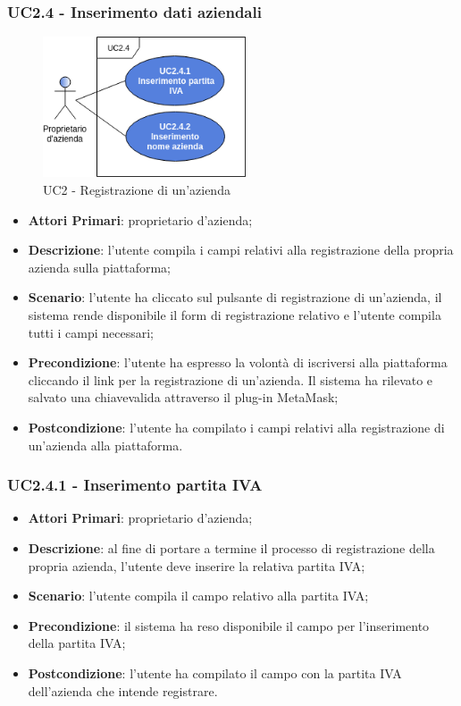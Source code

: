 \subsubsection{UC2.4 - Inserimento dati aziendali}
\begin{figure}[h]
	\includegraphics[width=6cm]{res/images/UC2-4RegistrazioneAzienda.png}
	\centering
	\caption{UC2 - Registrazione di un'azienda}
\end{figure}
\begin{itemize}
	\item \textbf{Attori Primari}: proprietario d'azienda;
	\item \textbf{Descrizione}: l'utente compila i campi relativi alla registrazione della propria azienda sulla piattaforma;
	\item \textbf{Scenario}: l'utente ha cliccato sul pulsante di registrazione di un'azienda, il sistema rende disponibile il form di registrazione relativo e l'utente compila tutti i campi necessari;
	\item \textbf{Precondizione}: l'utente ha espresso la volontà di iscriversi alla piattaforma cliccando il link per la registrazione di un'azienda. Il sistema ha rilevato e salvato una chiave\glosp valida attraverso il plug-in MetaMask\glo;
	\item \textbf{Postcondizione}: l'utente ha compilato i campi relativi alla registrazione di un'azienda alla piattaforma.
\end{itemize}
\subsubsection{UC2.4.1 - Inserimento partita IVA}
\begin{itemize}
	\item \textbf{Attori Primari}: proprietario d'azienda;
	\item \textbf{Descrizione}: al fine di portare a termine il processo di registrazione della propria azienda, l'utente deve inserire la relativa partita IVA;
	\item \textbf{Scenario}: l'utente compila il campo relativo alla partita IVA;
	\item \textbf{Precondizione}: il sistema ha reso disponibile il campo per l'inserimento della partita IVA;
	\item \textbf{Postcondizione}: l'utente ha compilato il campo con la partita IVA dell'azienda che intende registrare.
\end{itemize}
